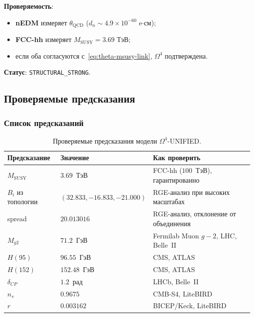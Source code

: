 \documentclass[11pt,a4paper]{article}
\newcommand{\Om}{\ensuremath{\Omega^4}}
\theoremstyle{definition}
\begin{document}
\noindent
\textbf{Проверяемость}:
\begin{itemize}
    \item \textbf{nEDM} измеряет $\theta_{\text{QCD}}$ ($d_n \sim 4.9 \times 10^{-60}$ e$\cdot$см);
    \item \textbf{FCC-hh} измеряет $M_{\text{SUSY}} = 3.69$ ТэВ;
    \item если оба согласуются с~\eqref{eq:theta-msusy-link}, $\Om$ подтверждена.
\end{itemize}

\medskip\noindent
\textbf{Статус}: \texttt{STRUCTURAL\_STRONG}.

\subsection{Проверяемые предсказания}
\label{subsec:conclusions-predictions}

\subsubsection{Список предсказаний}

\begin{table}[ht]
\centering
\caption{Проверяемые предсказания модели \texorpdfstring{$\Om$}{}-UNIFIED.}
\label{tab:conclusions-predictions}
\begin{tabular}{p{4cm}p{4cm}p{5cm}}
\toprule
Предсказание & Значение & Как проверить \\
\midrule
$M_{\text{SUSY}}$ & $3.69$~ТэВ &
    FCC-hh ($100$~ТэВ), гарантированно \\[0.3em]
$B_i$ из топологии &
    $(32.833, -16.833, -21.000)$ &
    RGE-анализ при высоких масштабах \\[0.3em]
spread &
    $20.013016$ &
    RGE-анализ, отклонение от объединения \\[0.3em]
$M_{g2}$ &
    $71.2$~ГэВ &
    Fermilab Muon $g-2$, LHC, Belle~II \\[0.3em]
$H(95)$ &
    $96.55$~ГэВ &
    CMS, ATLAS \\[0.3em]
$H(152)$ &
    $152.48$~ГэВ &
    CMS, ATLAS \\[0.3em]
$\delta_{CP}$ &
    $1.2$~рад &
    LHCb, Belle~II \\[0.3em]
$n_s$ &
    $0.9675$ &
    CMB-S4, LiteBIRD \\[0.3em]
$r$ &
    $0.003162$ &
    BICEP/Keck, LiteBIRD \\
\bottomrule
\end{tabular}
\end{table}
\end{document}
